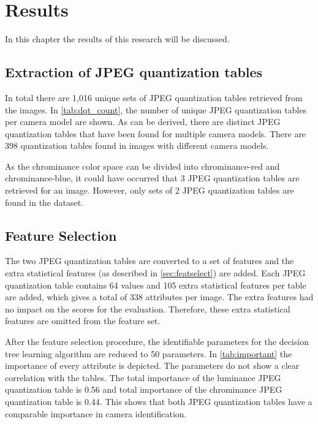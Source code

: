 
\chapter{Results} %

\label{ch:results} %

In this chapter the results of this research will be discussed. %

\section{Extraction of JPEG quantization tables}
In total there are 1,016 unique sets of JPEG quantization tables retrieved from the images. In \autoref{tab:dqt_count}, the number of unique JPEG quantization tables per camera model are shown. As can be derived, there are distinct JPEG quantization tables that have been found for multiple camera models. There are 398 quantization tables found in images with different camera models. 

As the chrominance color space can be divided into chrominance-red and chrominance-blue, it could have occurred that 3 JPEG quantization tables are retrieved for an image. However, only sets of 2 JPEG quantization tables are found in the dataset.

\section{Feature Selection}
The two JPEG quantization tables are converted to a set of features and the extra statistical features (as described in \autoref{sec:featselect}) are added. Each JPEG quantization table contains 64 values and 105 extra statistical features per table are added, which gives a total of 338 attributes per image. The extra features had no impact on the scores for the evaluation. Therefore, these extra statistical features are omitted from the feature set.

After the feature selection procedure, the identifiable parameters for the decision tree learning algorithm are reduced to 50 parameters. In \autoref{tab:important} the importance of every attribute is depicted. The parameters do not show a clear correlation with the tables. The total importance of the luminance JPEG quantization table is 0.56 and total importance of the chrominance JPEG quantization table is 0.44. 
This shows that both JPEG quantization tables have a comparable importance in camera identification.


